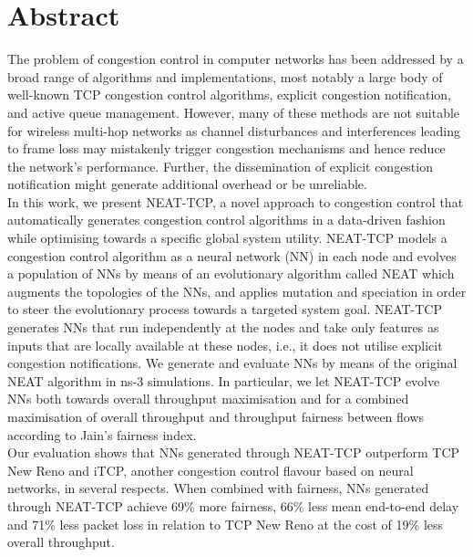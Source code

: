 \begingroup
\let\clearpage\relax
\let\cleardoublepage\relax
\let\cleardoublepage\relax

\chapter*{Abstract}
The problem of congestion control in computer networks has been addressed by a broad range of algorithms and implementations, most notably a large body of well-known TCP congestion control algorithms, explicit congestion notification, and active queue management.
However, many of these methods are not suitable for wireless multi-hop networks as channel disturbances and interferences leading to frame loss may mistakenly trigger congestion mechanisms and hence reduce the network's performance.
Further, the dissemination of explicit congestion notification might generate additional overhead or be unreliable.\\
In this work, we present NEAT-TCP, a novel approach to congestion control that automatically generates congestion control algorithms in a data-driven fashion while optimising towards a specific global system utility.
NEAT-TCP models a congestion control algorithm as a neural network (NN) in each node and evolves a population of NNs by means of an evolutionary algorithm called NEAT which augments the topologies of the NNs, and applies mutation and speciation in order to steer the evolutionary process towards a targeted system goal.
NEAT-TCP generates NNs that run independently at the nodes and take only features as inputs that are locally available at these nodes, i.e., it does not utilise explicit congestion notifications.
We generate and evaluate NNs by means of the original NEAT algorithm in ns-3 simulations.
In particular, we let NEAT-TCP evolve NNs both towards overall throughput maximisation and for a combined maximisation of overall throughput and throughput fairness between flows according to Jain's fairness index.\\
Our evaluation shows that NNs generated through NEAT-TCP outperform TCP New Reno and iTCP, another congestion control flavour based on neural networks, in several respects.
When combined with fairness, NNs generated through NEAT-TCP achieve 69\% more fairness, 66\% less mean end-to-end delay and 71\% less packet loss in relation to TCP New Reno at the cost of 19\% less overall throughput.
\newpage
\vfill

